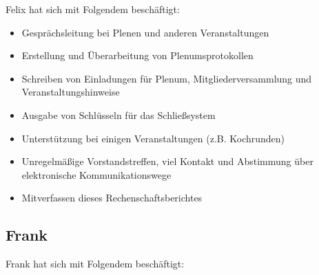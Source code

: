 \documentclass[10pt,DIV16]{scrartcl}
\begin{document}
Felix hat sich mit Folgendem beschäftigt:

\begin{itemize}
    \item Gesprächsleitung bei Plenen und anderen Veranstaltungen
    \item Erstellung und Überarbeitung von Plenumsprotokollen
    \item Schreiben von Einladungen für Plenum, Mitgliederversammlung und 
        Veranstaltungshinweise
    \item Ausgabe von Schlüsseln für das Schließsystem
    \item Unterstützung bei einigen Veranstaltungen (z.B. Kochrunden)
    \item Unregelmäßige Vorstandstreffen, viel Kontakt und Abstimmung über 
        elektronische Kommunikationswege
    \item Mitverfassen dieses Rechenschaftsberichtes
\end{itemize}

\subsection{Frank}

Frank hat sich mit Folgendem beschäftigt:
\end{document}
